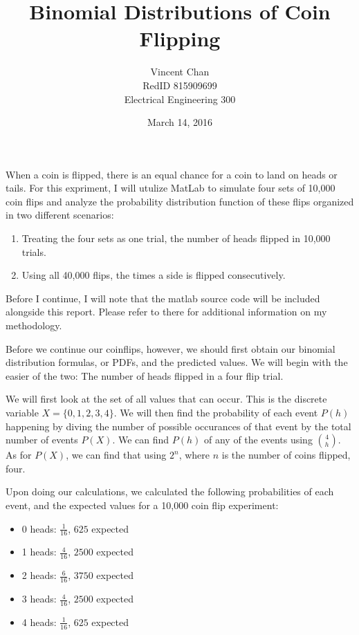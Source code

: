 \documentclass{report}
\begin{document}
\title{Binomial Distributions of Coin Flipping}
\author{Vincent Chan
		  \\RedID 815909699
		  \\Electrical Engineering 300}
\date{March 14, 2016}
\maketitle
\lstset{language=MatLab}

When a coin is flipped, there is an equal chance for a coin to land on heads or tails. For this expriment, I will utulize MatLab to simulate four sets of 10,000 coin flips and analyze the probability distribution function of these flips organized in two different scenarios:

\begin{enumerate}
\item{Treating the four sets as one trial, the number of heads flipped in 10,000 trials.}
\item{Using all 40,000 flips, the times a side is flipped consecutively.}
\end{enumerate}

Before I continue, I will note that the matlab source code will be included alongside this report. Please refer to there for additional information on my methodology.

Before we continue our coinflips, however, we should first obtain our binomial distribution formulas, or PDFs, and the predicted values. We will begin with the easier of the two: The number of heads flipped in a four flip trial.

We will first look at the set of all values that can occur. This is the discrete variable $X = \{0, 1, 2, 3, 4\}$. We will then find the probability of each event $P(h)$ happening by diving the number of possible occurances of that event by the total number of events $P(X)$. We can find $P(h)$ of any of the events using $4\choose h$. As for $P(X)$, we can find that using $2^n$, where $n$ is the number of coins flipped, four. 

Upon doing our calculations, we calculated the following probabilities of each event, and the expected values for a 10,000 coin flip experiment:

\begin{itemize}
\item{0 heads: $\frac{1}{16}$, $625$ expected}
\item{1 heads: $\frac{4}{16}$, $2500$ expected}
\item{2 heads: $\frac{6}{16}$, $3750$ expected}
\item{3 heads: $\frac{4}{16}$, $2500$ expected}
\item{4 heads: $\frac{1}{16}$, $625$ expected}
\end{itemize}
\end{document}
